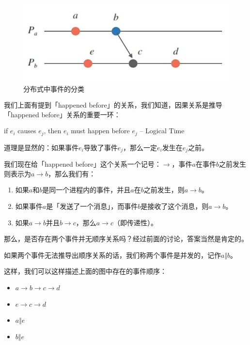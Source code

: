 \documentclass[cn,11pt,chinese]{elegantbook}
\providecommand{\tightlist}{%
  \setlength{\itemsep}{0pt}\setlength{\parskip}{0pt}}
\renewenvironment{quote}{\begin{customblockquote}\list{}{\rightmargin=0em\leftmargin=0em}%
\item\relax\color{blockquote-text}\ignorespaces}{\unskip\unskip\endlist\end{customblockquote}}
\begin{document}
\begin{figure}
\centering
\includegraphics{images/appendix-a-09.jpeg}
\caption{分布式中事件的分类}
\end{figure}

我们上面有提到「happened
before」的关系，我们知道，因果关系是推导「happened
before」关系的重要一环：

\begin{quote}
if \(e_i\) causes \(e_j\), then \(e_i\) must happen before \(e_j\) --
Logical Time
\end{quote}

道理是显然的：如果事件\(e_i\)导致了事件\(e_j\)，那么一定\(e_i\)发生在\(e_j\)之前。

我们现在给「happened
before」这个关系一个记号：\(\rightarrow\)，事件\(a\)在事件\(b\)之前发生则表示为\(a \rightarrow b\)，那么我们有：

\begin{enumerate}
\def\labelenumi{\arabic{enumi}.}
\tightlist
\item
  如果\(a\)和\(b\)是同一个进程内的事件，并且\(a\)在\(b\)之前发生，则\(a \rightarrow b\)。
\item
  如果事件\(a\)是「发送了一个消息」，而事件\(b\)是接收了这个消息，则\(a \rightarrow b\)。
\item
  如果\(a \rightarrow b\)并且\(b \rightarrow c\)，那么\(a \rightarrow c\)（即传递性）。
\end{enumerate}

那么，是否存在两个事件并无顺序关系吗？经过前面的讨论，答案当然是肯定的。

如果两个事件无法推导出顺序关系的话，我们称两个事件是并发的，记作\(a \Vert b\)。

这样，我们可以这样描述上面的图中存在的事件顺序：

\begin{itemize}
\tightlist
\item
  \(a \rightarrow b \rightarrow c \rightarrow d\)
\item
  \(e \rightarrow c \rightarrow d\)
\item
  \(a \Vert e\)
\item
  \(b \Vert e\)
\end{itemize}
\end{document}
